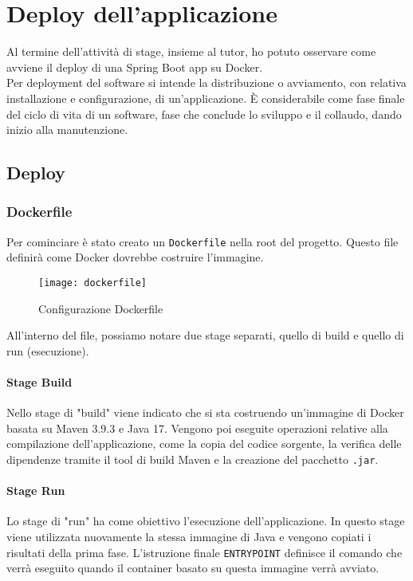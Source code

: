 \chapter{Deploy dell'applicazione}
\label{cap:deploy}

Al termine dell'attività di stage, insieme al tutor, ho potuto osservare come avviene il deploy di una Spring Boot app su Docker.\\
Per deployment del software si intende la distribuzione o avviamento, con relativa installazione e configurazione, di un'applicazione. È considerabile come fase finale del ciclo di vita di un software, fase che conclude lo sviluppo e il collaudo, dando inizio alla manutenzione.\\
\section{Deploy}
\subsection{Dockerfile}
Per cominciare è stato creato un \texttt{Dockerfile} nella root del progetto. Questo file definirà come Docker dovrebbe costruire l'immagine.
\begin{figure}[H] 
    \centering 
    \texttt{[image: dockerfile]} 
    \caption{Configurazione Dockerfile}
\end{figure}
\noindent All'interno del file, possiamo notare due stage separati, quello di build e quello di run (esecuzione).
\subsubsection*{Stage Build}
Nello stage di "build" viene indicato che si sta costruendo un'immagine di Docker basata su Maven 3.9.3 e Java 17. Vengono poi eseguite operazioni relative alla compilazione dell'applicazione, come la copia del codice sorgente, la verifica delle dipendenze tramite il tool di build Maven e la creazione del pacchetto \texttt{.jar}.
\subsubsection*{Stage Run}
Lo stage di "run" ha come obiettivo l'esecuzione dell'applicazione. In questo stage viene utilizzata nuovamente la stessa immagine di Java e vengono copiati i risultati della prima fase. L'istruzione finale \texttt{ENTRYPOINT} definisce il comando che verrà eseguito quando il container basato su questa immagine verrà avviato.
